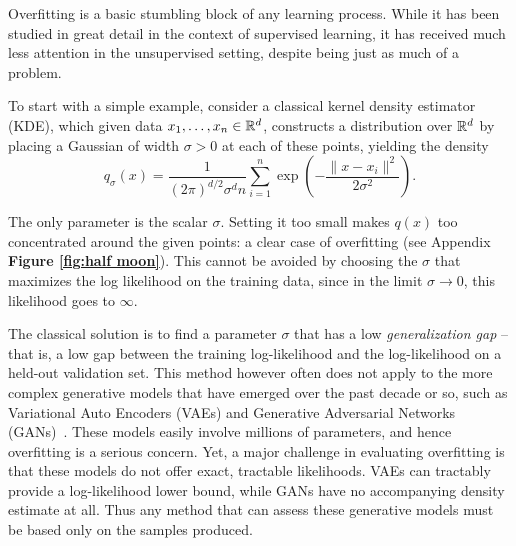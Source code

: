 Overfitting is a basic stumbling block of any learning process. While it has been studied in great detail in the context of supervised learning, it has received much less attention in the unsupervised setting, despite being just as much of a problem.

To start with a simple example, consider a classical kernel density estimator (KDE), which given data $x_1, \ldots, x_n \in {\mathbb R}^d$, constructs a distribution over ${\mathbb R}^d$ by placing a Gaussian of width $\sigma > 0$ at each of these points, yielding the density
\begin{equation}\label{eq:kde}
q_{\sigma}(x) = \frac{1}{(2\pi)^{d/2}\sigma^d n} \sum_{i=1}^n  \exp\left( -\frac{\|x-x_i\|^2}{2 \sigma^2}\right) .
\end{equation}

The only parameter is the scalar $\sigma$. Setting it too small makes $q(x)$ too concentrated around the given points: a clear case of overfitting (see Appendix \textbf{Figure \ref{fig:half moon}}). This cannot be avoided by choosing the $\sigma$ that maximizes the log likelihood on the training data, since in the limit $\sigma \rightarrow 0$, this likelihood goes to $\infty$. 

The classical solution is to find a parameter $\sigma$ that has a low {\em{generalization gap}} -- that is, a low gap between the training log-likelihood and the log-likelihood on a held-out validation set. This method however often does not apply to the more complex generative models that have emerged over the past decade or so, such as Variational Auto Encoders (VAEs) \citep{kingma} and Generative Adversarial Networks (GANs)~\citep{goodfellow}. These models easily involve millions of parameters, and hence overfitting is a serious concern. Yet, a major challenge in evaluating overfitting is that these models do not offer exact, tractable likelihoods. VAEs can tractably provide a log-likelihood lower bound, while GANs have no accompanying density estimate at all. Thus any method that can assess these generative models must be based only on the samples produced. 


